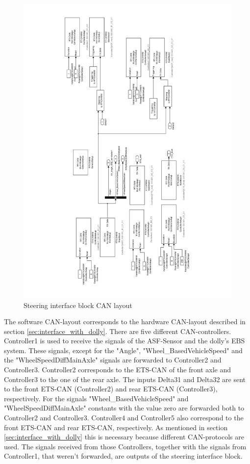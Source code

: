 \documentclass[ExampleMasters.tex]{subfiles}
\begin{document}
 \begin{figure}[!htb]
 	\centering
 	\includegraphics[width=0.95\linewidth]{figures/steering_interface_inside}
 	
 	\caption{Steering interface block \gls{CAN} layout}
 	\label{fig:steering_interface_inside_pdf}
 \end{figure}
 
 The software CAN-layout corresponds to the hardware CAN-layout described in section \ref{sec:interface_with_dolly}. There are five different CAN-controllers. Controller1 is used to receive the signals of the ASF-Sensor and the dolly's \gls{EBS} system. These signals, except for the "Angle", "Wheel\_BasedVehicleSpeed" and the "WheelSpeedDiffMainAxle" signals are forwarded to Controller2 and Controller3. Controller2 corresponds to the \gls{ETS}-\gls{CAN} of the front axle and Controller3 to the one of the rear axle. The inputs Delta31 and Delta32 are sent to the front \gls{ETS}-\gls{CAN} (Controller2) and rear \gls{ETS}-\gls{CAN} (Controller3), respectively. For the signals "Wheel\_BasedVehicleSpeed" and  "WheelSpeedDiffMainAxle" constants with the value zero are forwarded both to Controller2 and Controller3.
 Controller4 and Controller5 also correspond to the front \gls{ETS}-\gls{CAN} and rear \gls{ETS}-\gls{CAN}, respectively. As mentioned in section \ref{sec:interface_with_dolly} this is necessary because different CAN-protocols are used. The signals received from those Controllers, together with the signals from Controller1, that weren't forwarded, are outputs of the steering interface block.
  
\end{document}
